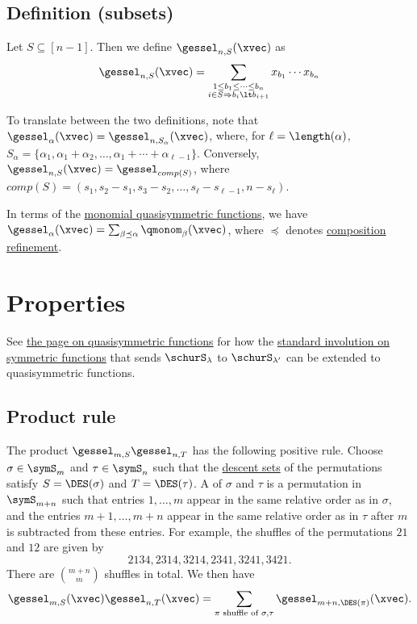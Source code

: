 \subsection[gesselDefinitionSubsets]{Definition (subsets)}

Let $S \subseteq [n-1]$.
Then we define $\gessel_{n,S}(\xvec)$ as
\begin{equation*}
 \gessel_{n,S}(\xvec) =
 \sum_{\substack{1 \leq b_1 \leq \dotsb \leq b_n \\
 i \in S \Rightarrow b_i \lt b_{i+1} }}
 x_{b_1} \dotsm x_{b_n}
\end{equation*}

To translate between the two definitions, note that
$\gessel_\alpha(\xvec) = \gessel_{n,S_\alpha}(\xvec)$, where, for
$\ell=\length(\alpha)$,
$S_\alpha = \{\alpha_1, \alpha_1+\alpha_2,\dotsc,
\alpha_1+\dotsb + \alpha_{\ell-1}\}$.
Conversely, $\gessel_{n,S}(\xvec) = \gessel_{comp(S)}$, where
$comp(S) = (s_1,s_2-s_1,s_3-s_2,\dotsc,s_{\ell} - s_{\ell-1},n-s_{\ell})$.

In terms of the \hyperref[qmonom]{monomial quasisymmetric functions},
we have
$\gessel_{\alpha}(\xvec)
= \sum_{\beta \preceq \alpha} \qmonom_\beta(\xvec)$, where $\preceq$ denotes
\hyperref[compositionRefinementOrder]{composition refinement}.

\section[gesselProperties]{Properties}

See \hyperref[standardQuasiInvolution]{the page on quasisymmetric functions}
for how the \hyperref[standardInvolution]{standard involution on symmetric functions}
that sends $\schurS_\lambda$ to $\schurS_{\lambda'}$ 
can be extended to quasisymmetric functions.


\subsection[gesselProduct]{Product rule}

The product $\gessel_{m,S} \gessel_{n,T}$ has the following positive rule.
Choose $\sigma \in \symS_m$ and $\tau \in \symS_n$ such that the
\hyperref[descentSet]{descent sets} of the permutations satisfy
$S = \DES(\sigma)$ and $T = \DES(\tau)$.
A \label{shuffleOfPermutations} of $\sigma$ and $\tau$ is a
permutation in $\symS_{m+n}$ such that entries $1,\dotsc,m$ appear in the same
relative order as in $\sigma$, and the entries $m+1,\dotsc,m+n$ appear in the
same relative order as in $\tau$ after $m$ is subtracted from these entries.
For example, the shuffles of the permutations $21$ and $12$ are given by
\[
2134, 2314, 3214, 2341, 3241, 3421.
\]
There are $\binom{m+n}{m}$ shuffles in total.
We then have
\[
\gessel_{m,S}(\xvec) \gessel_{n,T}(\xvec) =
\sum_{\pi \text{ shuffle of } \sigma,\tau }
\gessel_{m+n,\DES(\pi)}(\xvec).
\]


